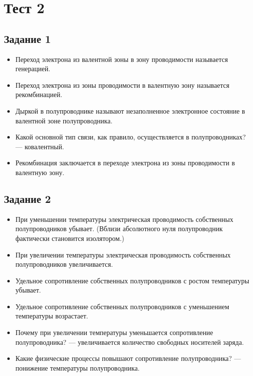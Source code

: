 \documentclass[../main.tex]{subfiles}
\begin{document}
\section{Тест 2}

\subsection{Задание 1}
\begin{itemize}
  \item Переход электрона из валентной зоны в зону проводимости называется генерацией.
  \item Переход электрона из зоны проводимости в валентную зону называется рекомбинацией.
  \item Дыркой в полупроводнике называют незаполненное электронное состояние в валентной зоне полупроводника.
  \item Какой основной тип связи, как правило, осуществляется в полупроводниках? --- ковалентный.
  \item Рекомбинация заключается в переходе электрона из зоны проводимости в валентную зону.
\end{itemize}

\subsection{Задание 2}
\begin{itemize}
  \item При уменьшении температуры электрическая проводимость собственных полупроводников убывает. (Вблизи абсолютного нуля полупроводник фактически становится изолятором.)
  \item При увеличении температуры электрическая проводимость собственных полупроводников увеличивается.
  \item Удельное сопротивление собственных полупроводников с ростом температуры убывает.
  \item Удельное сопротивление собственных полупроводников с уменьшением температуры возрастает.
  \item Почему при увеличении температуры уменьшается сопротивление полупроводника? --- увеличивается количество свободных носителей заряда.
  \item Какие физические процессы повышают сопротивление полупроводника? --- понижение температуры полупроводника.
\end{itemize}
\end{document}
